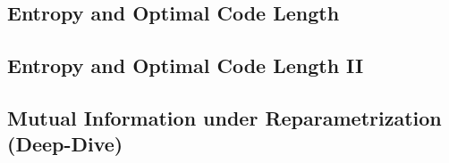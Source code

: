 \subsection{Entropy and Optimal Code Length}


\subsection{Entropy and Optimal Code Length II}


\subsection{Mutual Information under Reparametrization (Deep-Dive)}




